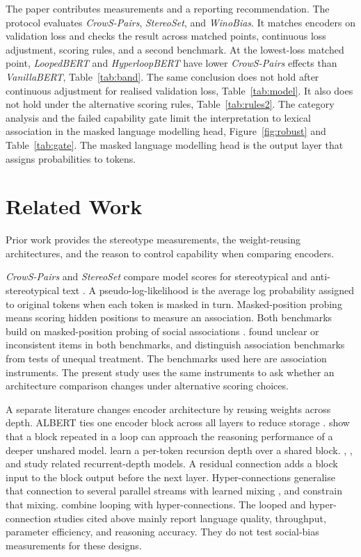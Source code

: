 \documentclass[sigconf,natbib=true,anonymous=true]{acmart}
\begin{document}
The paper contributes measurements and a reporting recommendation. The protocol
evaluates \emph{CrowS-Pairs}, \emph{StereoSet}, and \emph{WinoBias}. It matches
encoders on validation loss and checks the result across matched points,
continuous loss adjustment, scoring rules, and a second benchmark. At the
lowest-loss matched point, \emph{LoopedBERT} and \emph{HyperloopBERT} have lower
\emph{CrowS-Pairs} effects than \emph{VanillaBERT}, Table~\ref{tab:band}. The
same conclusion does not hold after continuous adjustment for realised
validation loss, Table~\ref{tab:model}. It also does not hold under the
alternative scoring rules, Table~\ref{tab:rules2}. The category analysis and the
failed capability gate limit the interpretation to lexical association in the
masked language modelling head, Figure~\ref{fig:robust} and
Table~\ref{tab:gate}. The masked language modelling head is the output layer
that assigns probabilities to tokens.

\section{Related Work}
\label{sec:related}

Prior work provides the stereotype measurements, the weight-reusing
architectures, and the reason to control capability when comparing encoders.

\emph{CrowS-Pairs} and \emph{StereoSet} compare model scores for stereotypical
and anti-stereotypical text \citep{nangia2020crows,nadeem2021stereoset}. A
pseudo-log-likelihood is the average log probability assigned to original tokens
when each token is masked in turn. Masked-position probing means scoring hidden
positions to measure an association. Both benchmarks build on masked-position
probing of social associations \citep{kurita2019measuring}.
\citet{blodgett2021salmon} found unclear or inconsistent items in both
benchmarks, and \citet{wang2025difference} distinguish association benchmarks
from tests of unequal treatment. The benchmarks used here are association
instruments. The present study uses the same instruments to ask whether an
architecture comparison changes under alternative scoring choices.

A separate literature changes encoder architecture by reusing weights across
depth. ALBERT ties one encoder block across all layers to reduce storage
\citep{lan2020albert}. \citet{saunshi2025looped} show that a block repeated in a
loop can approach the reasoning performance of a deeper unshared model.
\citet{bae2025mor} learn a per-token recursion depth over a shared block.
\citet{geiping2025huginn}, \citet{zhu2025ouro}, and \citet{frey2026adaptive}
study related recurrent-depth models. A residual connection adds a block input
to the block output before the next layer. Hyper-connections generalise that
connection to several parallel streams with learned mixing
\citep{zhu2025hyperconnections}, and \citet{xie2025mhc} constrain that mixing.
\citet{zeitoun2026hyperloop} combine looping with hyper-connections. The looped
and hyper-connection studies cited above mainly report language quality,
throughput, parameter efficiency, and reasoning accuracy. They do not test
social-bias measurements for these designs.
\end{document}
